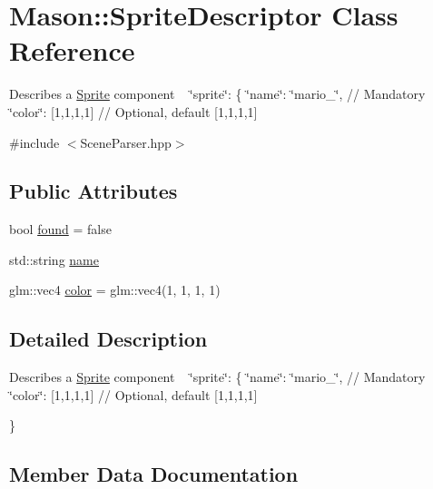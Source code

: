 \hypertarget{class_mason_1_1_sprite_descriptor}{}\section{Mason\+:\+:Sprite\+Descriptor Class Reference}
\label{class_mason_1_1_sprite_descriptor}


Describes a \hyperlink{class_mason_1_1_sprite}{Sprite} component ~\newline
 \char`\"{}sprite\char`\"{}\+: \{ \char`\"{}name\char`\"{}\+: \char`\"{}mario\+\_\char`\"{}, // Mandatory ~\newline
 \char`\"{}color\char`\"{}\+: \mbox{[}1,1,1,1\mbox{]} // Optional, default \mbox{[}1,1,1,1\mbox{]} ~\newline
  




{\ttfamily \#include $<$Scene\+Parser.\+hpp$>$}

\subsection*{Public Attributes}
\begin{DoxyCompactItemize}
\item 
bool \hyperlink{class_mason_1_1_sprite_descriptor_a28d5738152a1b83f32846de399ccc4e5}{found} = false
\item 
std\+::string \hyperlink{class_mason_1_1_sprite_descriptor_a78875744bb1e7ba41d6a35ccf83ba43c}{name}
\item 
glm\+::vec4 \hyperlink{class_mason_1_1_sprite_descriptor_a1f3ac0ebe14f163a74f558c421563fbb}{color} = glm\+::vec4(1, 1, 1, 1)
\end{DoxyCompactItemize}


\subsection{Detailed Description}
Describes a \hyperlink{class_mason_1_1_sprite}{Sprite} component ~\newline
 \char`\"{}sprite\char`\"{}\+: \{ \char`\"{}name\char`\"{}\+: \char`\"{}mario\+\_\char`\"{}, // Mandatory ~\newline
 \char`\"{}color\char`\"{}\+: \mbox{[}1,1,1,1\mbox{]} // Optional, default \mbox{[}1,1,1,1\mbox{]} ~\newline
 

\} 

\subsection{Member Data Documentation}
\hypertarget{class_mason_1_1_sprite_descriptor_a1f3ac0ebe14f163a74f558c421563fbb}{}\label{class_mason_1_1_sprite_descriptor_a1f3ac0ebe14f163a74f558c421563fbb} 
